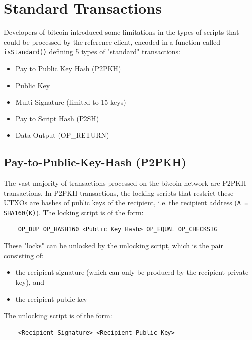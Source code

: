 \documentclass{article}
\newcounter{code}[section]
\begin{document}
\section{Standard Transactions}

    Developers of bitcoin introduced some limitations in the types of scripts that could be processed by the reference client, encoded in a function called \texttt{isStandard()} defining 5 types of "standard" transactions:

    \begin{itemize}
      \item Pay to Public Key Hash (P2PKH)
      \item Public Key
      \item Multi-Signature (limited to 15 keys)
      \item Pay to Script Hash (P2SH)
      \item Data Output (OP\_RETURN)
    \end{itemize}

  \subsection{Pay-to-Public-Key-Hash (P2PKH)}

    The vast majority of transactions processed on the bitcoin network are P2PKH transactions. In P2PKH transactions, the locking scripts that restrict these UTXOs are hashes of public keys of the recipient, i.e. the recipient address (\texttt{A = SHA160(K)}). The locking script is of the form:

    \begin{lstlisting}
    OP_DUP OP_HASH160 <Public Key Hash> OP_EQUAL OP_CHECKSIG
    \end{lstlisting}

    These "locks" can be unlocked by the unlocking script, which is the pair consisting of:

    \begin{itemize}
      \item the recipient signature (which can only be produced by the recipient private key), and
      \item the recipient public key
    \end{itemize}

    The unlocking script is of the form:

    \begin{lstlisting}
    <Recipient Signature> <Recipient Public Key>
    \end{lstlisting}
\end{document}
